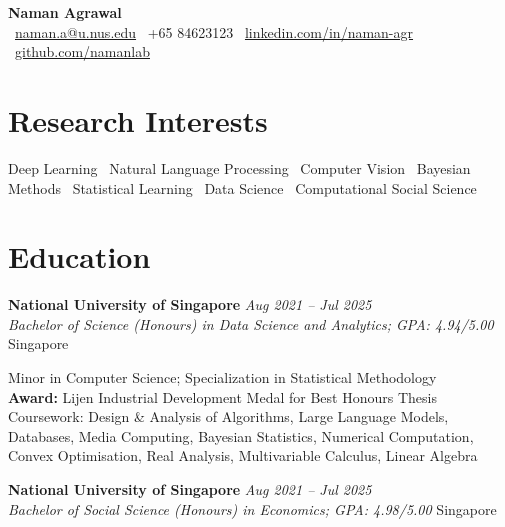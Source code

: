 \documentclass[10pt,a4paper]{article}
\newcommand{\cventry}[4]{%
\textbf{#1} \hfill \textit{#2} \\
\textit{#3} \hfill #4
\vspace{2pt}
}
\begin{document}
\begin{center}
{\LARGE\bfseries\textcolor{primary}{Naman Agrawal}}\\[6pt]
{\small
\faEnvelope\ \href{mailto:naman.a@u.nus.edu}{naman.a@u.nus.edu} \quad
\faPhone\ +65 84623123 \quad
\faLinkedin\ \href{https://linkedin.com/in/naman-agr}{linkedin.com/in/naman-agr} \quad
\faGithub\ \href{https://github.com/namanlab}{github.com/namanlab}
}
\end{center}

\vspace{-4pt}

\section{Research Interests}
Deep Learning \textbullet\ Natural Language Processing \textbullet\ Computer Vision \textbullet\ Bayesian Methods \textbullet\ Statistical Learning \textbullet\ Data Science \textbullet\ Computational Social Science

\section{Education}

\cventry{National University of Singapore}{Aug 2021 -- Jul 2025}{Bachelor of Science (Honours) in Data Science and Analytics; GPA: 4.94/5.00}{Singapore}

Minor in Computer Science; Specialization in Statistical Methodology\\
\textbf{Award:} Lijen Industrial Development Medal for Best Honours Thesis\\
Coursework: Design \& Analysis of Algorithms, Large Language Models, Databases, Media Computing, Bayesian Statistics, Numerical Computation, Convex Optimisation, Real Analysis, Multivariable Calculus, Linear Algebra

\vspace{6pt}

\cventry{National University of Singapore}{Aug 2021 -- Jul 2025}{Bachelor of Social Science (Honours) in Economics; GPA: 4.98/5.00}{Singapore}
\end{document}
